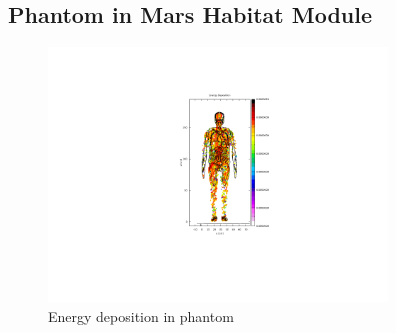 
\subsection{Phantom in Mars Habitat Module}



\begin{figure}
 \includegraphics[width=90mm]{figs/phantom_ed.png}
 \caption{Energy deposition in phantom}
 \label{fig:results_fig}
\end{figure}
